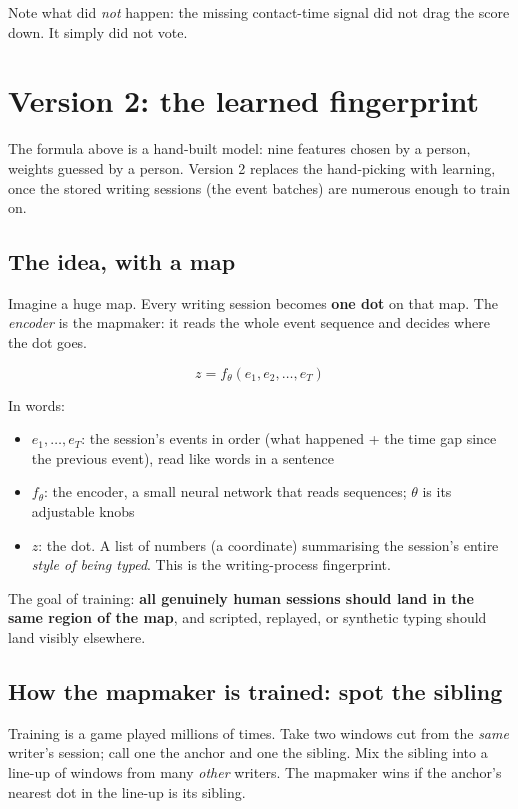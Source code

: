 \documentclass[11pt,a4paper]{article}
\begin{document}
Note what did \emph{not} happen: the missing contact-time signal did not drag the score down. It simply did not vote.

\section{Version 2: the learned fingerprint}

The formula above is a hand-built model: nine features chosen by a person, weights guessed by a person. Version 2 replaces the hand-picking with learning, once the stored writing sessions (the event batches) are numerous enough to train on.

\subsection*{The idea, with a map}

Imagine a huge map. Every writing session becomes \textbf{one dot} on that map. The \emph{encoder} is the mapmaker: it reads the whole event sequence and decides where the dot goes.

\[
z = f_\theta(e_1, e_2, \ldots, e_T)
\]

In words:
\begin{itemize}
  \item $e_1, \ldots, e_T$: the session's events in order (what happened + the time gap since the previous event), read like words in a sentence
  \item $f_\theta$: the encoder, a small neural network that reads sequences; $\theta$ is its adjustable knobs
  \item $z$: the dot. A list of numbers (a coordinate) summarising the session's entire \emph{style of being typed}. This is the writing-process fingerprint.
\end{itemize}

The goal of training: \textbf{all genuinely human sessions should land in the same region of the map}, and scripted, replayed, or synthetic typing should land visibly elsewhere.

\subsection*{How the mapmaker is trained: spot the sibling}

Training is a game played millions of times. Take two windows cut from the \emph{same} writer's session; call one the anchor and one the sibling. Mix the sibling into a line-up of windows from many \emph{other} writers. The mapmaker wins if the anchor's nearest dot in the line-up is its sibling.
\end{document}
